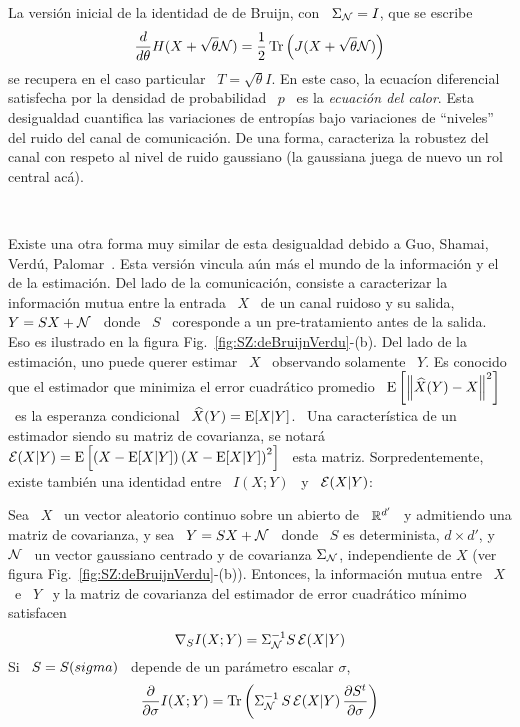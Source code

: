 La versi\'on  inicial de la identidad de  de Bruijn, con \  $\Sigma_{\mathcal{N}} = I$,
que se escribe
%
\[
\frac{d}{d\theta}     H(X+\sqrt{\theta}    \mathcal{N})    =     \frac12    \operatorname{Tr}\left(
  J(X+\sqrt{\theta} \mathcal{N}) \right)
\]
%
se recupera  en el caso particular  \ $T =  \sqrt{\theta} I$.  En este  caso, la
ecuac\'ion diferencial satisfecha por la densidad  de probabilidad \ $p$ \ es la
{\it  ecuaci\'on del  calor}.  Esta  desigualdad cuantifica  las  variaciones de
entrop\'ias   bajo  variaciones   de  ``niveles''   del  ruido   del   canal  de
comunicaci\'on. De una  forma, caracteriza la robustez del  canal con respeto al
nivel de ruido gaussiano (la gaussiana juega de nuevo un rol central ac\'a).

\

Existe una  otra forma  muy similar  de esta desigualdad  debido a  Guo, Shamai,
Verd\'u, Palomar~\cite{GuoSha05,  PalVer06}. Esta versi\'on  vincula a\'un m\'as
el  mundo  de  la informaci\'on  y  el  de  la  estimaci\'on.   Del lado  de  la
comunicaci\'on, consiste a caracterizar  la informaci\'on mutua entre la entrada
\ $X$ \ de  un canal ruidoso y su salida, \  $Y = S X + \mathcal{N}$ \  donde \ $S$ \
coresponde  a un  pre-tratamiento antes  de la  salida. Eso  es ilustrado  en la
figura  Fig.~\ref{fig:SZ:deBruijnVerdu}-(b).  Del lado  de la  estimaci\'on, uno
puede querer  estimar \ $X$  \ observando solamente  \ $Y$.  Es conocido  que el
estimador  que minimiza  el error  cuadr\'atico promedio  \  $\operatorname{E}\left[ \left\|
    \widehat{X}(Y)  - X  \right\|^2 \right]$  \  es la  esperanza condicional  \
$\widehat{X}(Y) = \operatorname{E}[X|Y]$.  \ Una caracter\'istica de un  estimador siendo su
matriz de covarianza,  se notar\'a \ $\mathcal{E}(X|Y) = \operatorname{E}\left[  \left( X - \operatorname{E}[X|Y]
  \right)   \left(   X  -   \operatorname{E}[X|Y]   \right)^2   \right]$   \  esta   matriz.
Sorpredentemente,  existe  tambi\'en  una  identidad  entre \  $I(X;Y)$  \  y  \
$\mathcal{E}(X|Y)$:
%
\begin{teorema}
  Sea \ $X$ \ un vector aleatorio  continuo sobre un abierto de \ $\mathbb{R}^{d'}$ \
  y admitiendo una  matriz de covarianza, y sea \  $Y = S X +  \mathcal{N}$ \ donde \
  $S$  es determinista,  $d  \times d'$,  y  \ $\mathcal{N}$  \  un vector  gaussiano
  centrado  y de covarianza  $\Sigma_{\mathcal{N}}$, independiente  de $X$  (ver figura
  Fig.~\ref{fig:SZ:deBruijnVerdu}-(b)). Entonces, la informaci\'on mutua entre \
  $X$ \ e \ $Y$ \ y  la matriz de covarianza del estimador de error cuadr\'atico
  m\'inimo satisfacen
  \[
  \nabla_S I(X;Y) = \Sigma_{\mathcal{N}}^{-1} S \, \mathcal{E}(X|Y)
  \]
  Si \ $S = S(\\sigma)$ \ depende de un par\'ametro escalar $\sigma$,
  \[
  \frac{\partial}{\partial \sigma} I(X;Y) = \operatorname{Tr}\left( \Sigma_{\mathcal{N}}^{-1} \, S \,
    \mathcal{E}(X|Y) \, \frac{\partial S^t}{\partial \sigma} \right)
  \]
\end{teorema}
